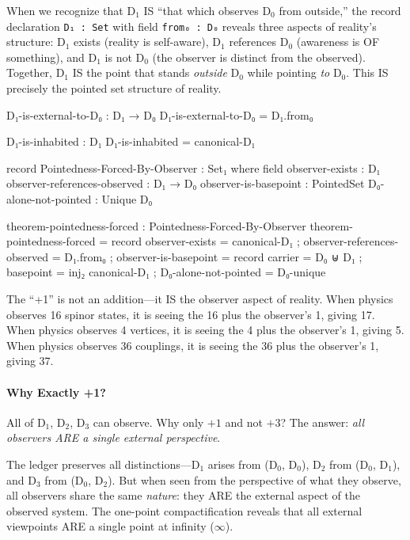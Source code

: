 \documentclass[11pt,a4paper]{book}
\begin{document}
When we recognize that D$_1$ IS ``that which observes D$_0$ from outside,'' 
the record declaration \texttt{D₁ : Set} with field \texttt{from₀ : D₀} reveals 
three aspects of reality's structure: D$_1$ exists (reality is self-aware), D$_1$ 
references D$_0$ (awareness is OF something), and D$_1$ is not D$_0$ (the observer 
is distinct from the observed). Together, D$_1$ IS the point that stands 
\emph{outside} D$_0$ while pointing \emph{to} D$_0$. This IS precisely the 
pointed set structure of reality.

\begin{code}
D₁-is-external-to-D₀ : D₁ → D₀
D₁-is-external-to-D₀ = D₁.from₀

D₁-is-inhabited : D₁
D₁-is-inhabited = canonical-D₁

record Pointedness-Forced-By-Observer : Set₁ where
  field
    observer-exists : D₁
    observer-references-observed : D₁ → D₀
    observer-is-basepoint : PointedSet
    D₀-alone-not-pointed : Unique D₀

theorem-pointedness-forced : Pointedness-Forced-By-Observer
theorem-pointedness-forced = record
  { observer-exists = canonical-D₁
  ; observer-references-observed = D₁.from₀
  ; observer-is-basepoint = record 
      { carrier = D₀ ⊎ D₁
      ; basepoint = inj₂ canonical-D₁
      }
  ; D₀-alone-not-pointed = D₀-unique
  }
\end{code}

The ``+1'' is not an addition—it IS the observer aspect of reality. When physics 
observes 16 spinor states, it is seeing the 16 plus the observer's 1, giving 17. 
When physics observes 4 vertices, it is seeing the 4 plus the observer's 1, giving 5. 
When physics observes 36 couplings, it is seeing the 36 plus the observer's 1, giving 37.

\paragraph{Why Exactly +1?}
All of D$_1$, D$_2$, D$_3$ can observe. Why only $+1$ and not $+3$? The answer: 
\emph{all observers ARE a single external perspective}.

The ledger preserves all distinctions—D$_1$ arises from (D$_0$, D$_0$), 
D$_2$ from (D$_0$, D$_1$), and D$_3$ from (D$_0$, D$_2$). But when seen from 
the perspective of what they observe, all observers share the same \emph{nature}: 
they ARE the external aspect of the observed system. The one-point compactification 
reveals that all external viewpoints ARE a single point at infinity ($\infty$).
\end{document}
